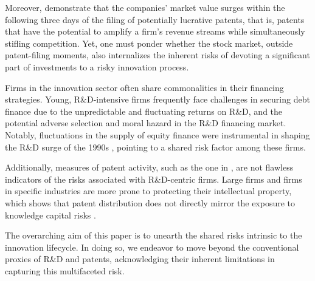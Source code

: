 \documentclass[12pt, letterpaper]{article}
\begin{document}
Moreover, \citet{Kogan2017-fx} demonstrate that the companies' market value  surges within the following three days of the filing of potentially lucrative patents, that is, patents that have the potential to amplify a firm's revenue streams while simultaneously stifling competition. Yet, one must ponder whether the stock market, outside patent-filing moments, also internalizes the inherent risks of devoting a significant part of investments to a risky innovation process.

Firms in the innovation sector often share commonalities in their financing strategies. Young, R\&D-intensive firms frequently face challenges in securing debt finance due to the unpredictable and fluctuating returns on R\&D, and the potential adverse selection and moral hazard in the R\&D financing market. Notably, fluctuations in the supply of equity finance were instrumental in shaping the R\&D surge of the 1990s \citep{Brown2009-zp}, pointing to a shared risk factor among these firms.

Additionally, measures of patent activity, such as the one in \cite{Kogan2017-fx}, are not flawless indicators of the risks associated with R\&D-centric firms. Large firms and firms in specific industries are more prone to protecting their intellectual property, which shows that patent distribution does not directly mirror the exposure to knowledge capital risks \citep{mezzanotti2023innovation}.

The overarching aim of this paper is to unearth the shared risks intrinsic to the innovation lifecycle. In doing so, we endeavor to move beyond the conventional proxies of R\&D and patents, acknowledging their inherent limitations in capturing this multifaceted risk.
\end{document}
